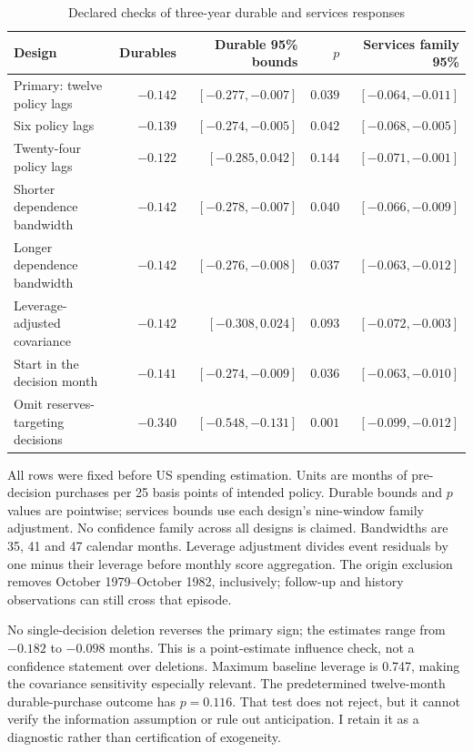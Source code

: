\documentclass[11pt,a4paper]{article}
\begin{document}
\begin{table}[htbp]
\centering\small
\caption{Declared checks of three-year durable and services responses}
\label{tab:robustness}
\begin{tabular}{@{}lrrrr@{}}
\toprule
Design & Durables & Durable 95\% bounds & $p$ & Services family 95\% \\
\midrule
Primary: twelve policy lags & $-0.142$ & $[-0.277,-0.007]$ & $0.039$ & $[-0.064,-0.011]$ \\
Six policy lags & $-0.139$ & $[-0.274,-0.005]$ & $0.042$ & $[-0.068,-0.005]$ \\
Twenty-four policy lags & $-0.122$ & $[-0.285,0.042]$ & $0.144$ & $[-0.071,-0.001]$ \\
Shorter dependence bandwidth & $-0.142$ & $[-0.278,-0.007]$ & $0.040$ & $[-0.066,-0.009]$ \\
Longer dependence bandwidth & $-0.142$ & $[-0.276,-0.008]$ & $0.037$ & $[-0.063,-0.012]$ \\
Leverage-adjusted covariance & $-0.142$ & $[-0.308,0.024]$ & $0.093$ & $[-0.072,-0.003]$ \\
Start in the decision month & $-0.141$ & $[-0.274,-0.009]$ & $0.036$ & $[-0.063,-0.010]$ \\
Omit reserves-targeting decisions & $-0.340$ & $[-0.548,-0.131]$ & $0.001$ & $[-0.099,-0.012]$ \\
\bottomrule
\end{tabular}
\par\smallskip\begin{minipage}{.97\textwidth}\footnotesize
All rows were fixed before US spending estimation. Units are months of pre-decision purchases per 25 basis points of intended policy. Durable bounds and $p$ values are pointwise; services bounds use each design's nine-window family adjustment. No confidence family across all designs is claimed. Bandwidths are 35, 41 and 47 calendar months. Leverage adjustment divides event residuals by one minus their leverage before monthly score aggregation. The origin exclusion removes October 1979--October 1982, inclusively; follow-up and history observations can still cross that episode.
\end{minipage}
\end{table}

No single-decision deletion reverses the primary sign; the estimates range from $-0.182$ to $-0.098$ months. This is a point-estimate influence check, not a confidence statement over deletions. Maximum baseline leverage is 0.747, making the covariance sensitivity especially relevant. The predetermined twelve-month durable-purchase outcome has $p=0.116$. That test does not reject, but it cannot verify the information assumption or rule out anticipation. I retain it as a diagnostic rather than certification of exogeneity.
\end{document}
